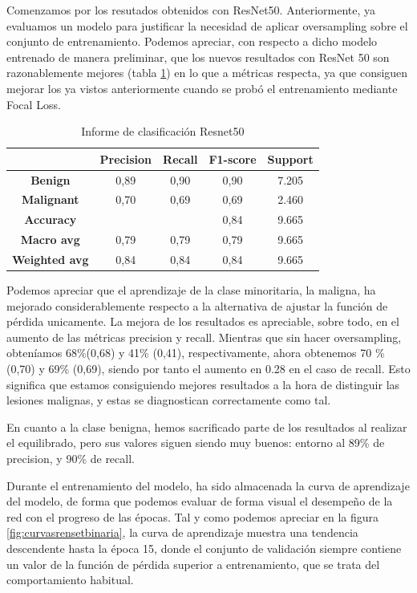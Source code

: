 Comenzamos por los resutados obtenidos con ResNet50. Anteriormente, ya evaluamos un modelo para justificar la necesidad de aplicar oversampling sobre el conjunto de entrenamiento. Podemos apreciar, con respecto a dicho modelo entrenado de manera preliminar, que los nuevos resultados con ResNet 50 son razonablemente mejores (tabla \ref{tab:resultsbinrn50}) en lo que a métricas respecta, ya que consiguen mejorar los ya vistos anteriormente cuando se probó el entrenamiento mediante Focal Loss.

\begin{table}[!ht]
	\centering
	\begin{tabular}{|c|c|c|c|c|}
		\hline
		\textbf{} & \textbf{Precision} & \textbf{Recall} & \textbf{F1-score} & \textbf{Support} \\ \hline
		\textbf{Benign} & 0,89 & 0,90 & 0,90 & 7.205 \\ \hline
		\textbf{Malignant} & 0,70 & 0,69 & 0,69 & 2.460 \\ \hline
		\textbf{Accuracy} & ~ & ~ & 0,84 & 9.665 \\ \hline
		\textbf{Macro avg} & 0,79 & 0,79 & 0,79 & 9.665 \\ \hline
		\textbf{Weighted avg} & 0,84 & 0,84 & 0,84 & 9.665 \\ \hline
	\end{tabular}
	\caption{Informe de clasificación Resnet50}
	\label{tab:resultsbinrn50}
\end{table}


Podemos apreciar que el aprendizaje de la clase minoritaria, la maligna, ha mejorado considerablemente respecto a la alternativa de ajustar la función de pérdida unicamente. La mejora de los resultados es apreciable, sobre todo, en el aumento de las métricas precision y recall. Mientras que sin hacer oversampling, obteníamos 68\%(0,68) y 41\% (0,41), respectivamente, ahora obtenemos 70 \% (0,70) y 69\% (0,69), siendo por tanto el aumento en 0.28 en el caso de recall. Esto significa que estamos consiguiendo mejores resultados a la hora de distinguir las lesiones malignas, y estas se diagnostican correctamente como tal.

En cuanto a la clase benigna, hemos sacrificado parte de los resultados al realizar el equilibrado, pero sus valores siguen siendo muy buenos: entorno al 89\% de precision, y 90\% de recall.

Durante el entrenamiento del modelo, ha sido almacenada la curva de aprendizaje del modelo, de forma que podemos evaluar de forma visual el desempeño de la red con el progreso de las  épocas.  Tal y como podemos apreciar en la figura \ref{fig:curvasrensetbinaria}, la curva de aprendizaje muestra una tendencia descendente hasta la época 15, donde el conjunto de validación siempre contiene un valor de la función de pérdida superior a entrenamiento, que se trata del comportamiento habitual.

